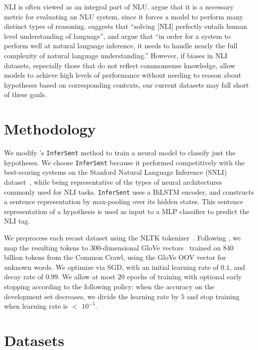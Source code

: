 NLI is often viewed as an integral part of NLU.  argue that it is a necessary metric for evaluating an NLU system, since it forces a model to perform many distinct types of reasoning.   suggests that ``solving [NLI] perfectly entails human level understanding of language'', and  argue that ``in order for a system to perform well at natural language inference, it needs to handle nearly the full complexity of natural language understanding.''  However, if biases in NLI datasets, especially those that do not reflect commonsense knowledge, allow models to achieve high levels of performance without needing to reason about hypotheses based on corresponding contexts, our current datasets may fall short of these goals.

\section{Methodology}

We modify 's \texttt{InferSent} method to train a neural model to classify just the hypotheses.  We choose \texttt{InferSent} because it performed competitively with the best-scoring systems on the Stanford Natural Language Inference (SNLI) dataset~\cite{snli:emnlp2015}, while being representative of the types of neural architectures commonly used for NLI tasks. \texttt{InferSent} uses a BiLSTM encoder, and constructs a sentence representation by max-pooling over its hidden states. This sentence representation of a hypothesis is used as input to a MLP classifier to predict the NLI tag.

We preprocess each recast dataset using the NLTK tokenizer~\cite{loper2002nltk}. Following , we map the resulting tokens to 300-dimensional GloVe vectors~\cite{pennington2014glove} trained on 840 billion tokens from the Common Crawl, using the GloVe OOV vector for unknown words. We optimize via SGD, with an initial learning rate of $0.1$, and decay rate of $0.99$. We allow at most $20$ epochs of training with optional early stopping according to the following policy: when the accuracy on the development set decreases, we divide the learning rate by $5$ and stop training when learning rate is $<$ $10^{-5}$.

\section{Datasets}

